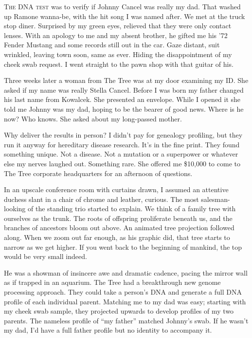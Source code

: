 
\lettrine{T}{he DNA test} was to verify if Johnny Cancel was really my dad. That
washed up Ramone wanna-be, with the hit song I was named after. We met
at the truck stop diner. Surprised by my green eyes, relieved that they
were only contact lenses. With an apology to me and my absent brother,
he gifted me his '72 Fender Mustang and some records still out in the
car. Gaze distant, suit wrinkled, leaving town soon, same as ever.
Hiding the disappointment of my cheek swab request. I went straight to
the pawn shop with that guitar of his.

Three weeks later a woman from The Tree was at my door examining my ID.
She asked if my name was really Stella Cancel. Before I was born my
father changed his last name from Kowalcek. She presented an envelope.
While I opened it she told me Johnny was my dad, hoping to be the bearer
of good news. Where is he now? Who knows. She asked about my long-passed
mother.

Why deliver the results in person? I didn't pay for genealogy profiling,
but they run it anyway for hereditary disease research. It's in the fine
print. They found something unique. Not a disease. Not a mutation or a
superpower or whatever else my nerves laughed out. Something rare. She
offered me \$10,000 to come to The Tree corporate headquarters for an
afternoon of questions.

\specscene

In an upscale conference room with curtains drawn, I assumed an
attentive duchess slant in a chair of chrome and leather, curious. The
most salesman-looking of the standing trio started to explain. We think
of a family tree with ourselves as the trunk. The roots of offspring
proliferate beneath us, and the branches of ancestors bloom out above.
An animated tree projection followed along. When we zoom out far enough,
as his graphic did, that tree starts to narrow as we get higher. If you
went back to the beginning of mankind, the top would be very small
indeed.

He was a showman of insincere awe and dramatic cadence, pacing the
mirror wall as if trapped in an aquarium. The Tree had a breakthrough
new genome processing approach. They could take a person's DNA and
generate a full DNA profile of each individual parent. Matching me to my
dad was easy; starting with my cheek swab sample, they projected upwards
to develop profiles of my two parents. The nameless profile of ``my
father'' matched Johnny's swab. If he wasn't my dad, I'd have a full
father profile but no identity to accompany it.

